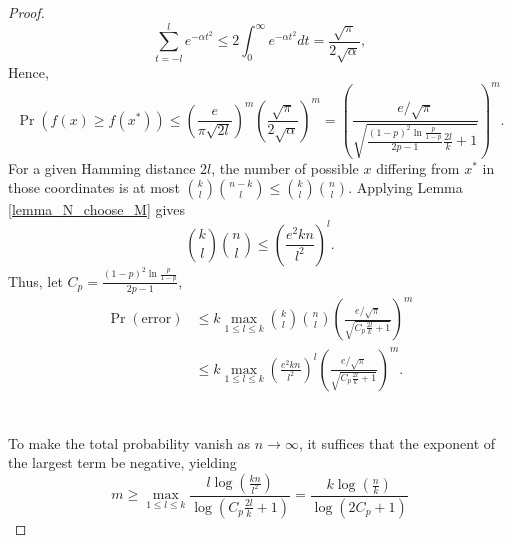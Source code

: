 \documentclass{article}
\begin{document}
\begin{proof}
\[
\sum_{t=-l}^l e^{-\alpha t^2}
\le 2\int_{0}^\infty e^{-\alpha t^2}dt
= \frac{\sqrt{\pi}}{2\sqrt{\alpha}},
\]
Hence,
\[
\Pr(f(x)\ge f(x^*))
\le \left(\frac{e}{\pi\sqrt{2l}}\right)^m
     \left(\frac{\sqrt{\pi}}{2\sqrt{\alpha}}\right)^m
= \left(\frac{e/\sqrt{\pi}}{\sqrt{\frac{(1-p)^2\ln\frac{p}{1-p}}{2p-1}\frac{2l}{k}+1}}\right)^m.
\]
For a given Hamming distance $2l$, the number of possible $x$ differing from $x^*$ in those coordinates is at most ${k \choose l}{n-k \choose l} \le {k \choose l}{n \choose l}$.  
Applying Lemma \ref{lemma_N_choose_M} gives
\[
{k \choose l}{n \choose l} \le
\left(\frac{e^2kn}{l^2}\right)^l.
\]
Thus, let $C_p=\frac{(1-p)^2\ln\frac{p}{1-p}}{2p-1}$, 
\begin{align*}
\Pr(\text{error})
&\le k \max_{1\le l\le k}
     {k \choose l}{n \choose l}
     \left(\frac{e/\sqrt{\pi}}{\sqrt{C_p\frac{2l}{k}+1}}\right)^m\\
&\le k \max_{1\le l\le k}
     \left(\frac{e^2kn}{l^2}\right)^l
     \left(\frac{e/\sqrt{\pi}}{\sqrt{C_p\frac{2l}{k}+1}}\right)^m.
\end{align*}
\\\\
To make the total probability vanish as $n\to\infty$, it suffices that the exponent of the largest term be negative, yielding
\[
m \ge \max_{1\le l\le k}
     \frac{l\log(\frac{kn}{l^2})}{\log(C_p\frac{2l}{k}+1)} = \frac{k\log(\frac{n}{k})}{\log(2C_p+1)}
\]
\end{proof}
\end{document}
